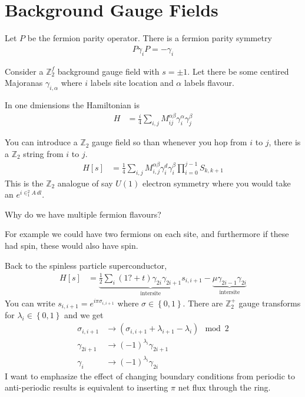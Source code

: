 \section{Background Gauge Fields}
Let $P$ be the fermion parity operator.
There is a fermion parity symmetry
\begin{align}
    P \gamma_i P = -\gamma_i
\end{align}

Consider a $\mathbb{Z}_2^f$ background gauge field with $s=\pm 1$.
Let there be some centired Majoranas $\gamma_{i,\alpha}$
where $i$ labels site location
and $\alpha$ labels flavour.

In one dmiensions the Hamiltonian is
\begin{align}
    H &= \frac{i}{4}\sum_{i,j}
    M_{ij}^{\alpha\beta} \gamma_i^\alpha \gamma_j^\beta
\end{align}

You can introduce a $\mathbb{Z}_2$ gauge field so than whenever you hop from $i$
to $j$,
there is a $\mathbb{Z}_2$ string from $i$ to $j$.
\begin{align}
    H[s] &=
    \frac{1}{4}\sum_{i,j}M_{i,j}^{\alpha\beta}
    \gamma_i^d \gamma_i^\beta
    \prod_{i=0}^{j - 1} S_{k,k + 1}
\end{align}
This is the $\mathbb{Z}_2$ analogue of say $U(1)$ electron symmetry
where you would take an $e^{i\in_1^2 A\, dl}$.

\begin{question}
    Why do we have multiple fermion flavours?
\end{question}
For example we could have two fermions on each site,
and furthermore if these had spin,
these would also have spin.

Back to the spinless particle superconductor,
\begin{align}
    H[s] &=
    \underbrace{
        \frac{1}{2}\sum_{i}(1? + t) \gamma_{2i}\gamma_{2i + 1} s_{i,i+1}
    }_{\text{intersite}}
    - \underbrace{\mu \gamma_{2i - 1}\gamma_{2i}}_{\text{intersite}}
\end{align}
You can write
$s_{i,i+1}=e^{i\pi \sigma_{i,i+1}}$
where $\sigma\in\left\{ 0, 1 \right\}$.
There are $\mathbb{Z}_2^+$ gauge transforms for
$\lambda_i\in\left\{ 0, 1 \right\}$
and we get 
\begin{align}
    \sigma_{i, i + 1} &\to
    \left(
        \sigma_{i, i+1} + \lambda_{i + 1} - \lambda_i
    \right)\mod 2\\
    \gamma_{2i + 1} &\to
    (-1)^{\lambda_i}
    \gamma_{2i + 1}\\
    \gamma_i &\to
    (-1)^{\lambda_i} \gamma_{2i}
\end{align}
I want to emphasize the effect of changing boundary conditions from periodic to
anti-periodic results is equivalent to inserting $\pi$ net flux through the
ring.

